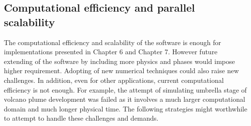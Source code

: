 \subsection{Computational efficiency and parallel scalability}
The computational efficiency and scalability of the software is enough for implementations presented in Chapter 6 and Chapter 7. However future extending of the software by including more physics and phases would impose higher requirement. Adopting of new numerical techniques could also raise new challenges. In addition, even for other applications, current computational efficiency is not enough. For example, the attempt of simulating umbrella stage of volcano plume development was failed as it involves a much larger computational domain and much longer physical time. The following strategies might worthwhile to attempt to handle these challenges and demands. 

